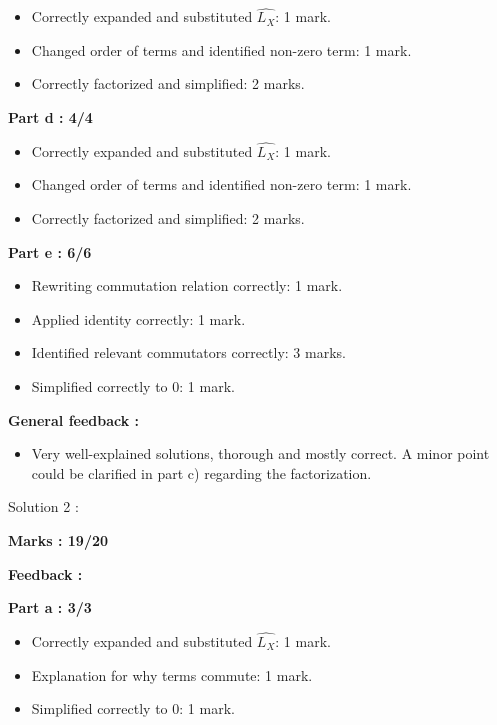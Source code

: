 \documentclass[a4paper,11pt]{article}
\begin{document}
\begin{itemize}
    \item Correctly expanded and substituted $\hat{L_X}$: 1 mark.
    \item Changed order of terms and identified non-zero term: 1 mark.
    \item Correctly factorized and simplified: 2 marks.
\end{itemize}


\textbf{Part d : 4/4}

\begin{itemize}
    \item Correctly expanded and substituted $\hat{L_X}$: 1 mark.
    \item Changed order of terms and identified non-zero term: 1 mark.
    \item Correctly factorized and simplified: 2 marks.
\end{itemize}



\textbf{Part e : 6/6}

\begin{itemize}
    \item Rewriting commutation relation correctly: 1 mark.
    \item Applied identity correctly: 1 mark.
    \item Identified relevant commutators correctly: 3 marks.
    \item Simplified correctly to 0: 1 mark.
\end{itemize}


\textbf{General feedback :}

\begin{itemize}
    \item Very well-explained solutions, thorough and mostly correct. A minor point could be clarified in part c) regarding the factorization.
\end{itemize}



Solution 2 :

\textbf{Marks : 19/20}

\textbf{Feedback :}

\textbf{Part a : 3/3}

\begin{itemize}
    \item Correctly expanded and substituted $\hat{L_X}$: 1 mark.
    \item Explanation for why terms commute: 1 mark.
    \item Simplified correctly to 0: 1 mark.
\end{itemize}
\end{document}
